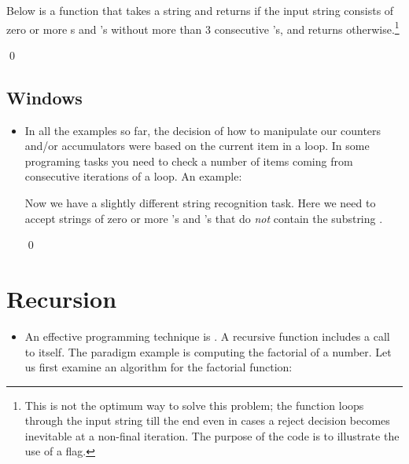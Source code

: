 \documentclass[a4paper]{article}
\begin{document}
{\begin{itemize}
\begin{ucode}
Below is a function that takes a string and returns
 if the input string consists of zero or more s and 's
without more than 3 consecutive
's, and returns  otherwise.\footnote{This is not the optimum way
to solve this problem; the function loops through the input string till the end
even in cases a reject decision becomes inevitable at a non-final iteration. The
purpose of the code is to illustrate the use of a flag.}

\begin{ucodeframe}
\end{ucodeframe}

\qed
\end{ucode}

\end{itemize}

\subsection{Windows}

\begin{itemize}

\item In all the examples so far, the decision of how to manipulate our counters
and/or accumulators were based on the current item in a loop. In some programing
tasks you need to check a number of items coming from consecutive iterations of
a loop. An example:

\begin{ucode}

Now we have a slightly different string recognition task. 
Here we need to accept strings of zero or more 's and 's that do \emph{not}
contain the substring .

\begin{ucodeframe}
\end{ucodeframe}

\qed
\end{ucode}
\end{itemize}

\section{Recursion}

\begin{itemize}

\item An effective programming technique is . A recursive
function includes a call to itself. The paradigm example is computing the
factorial of a number. Let us first examine an  algorithm for
the factorial function:


\end{itemize}}
\end{document}
